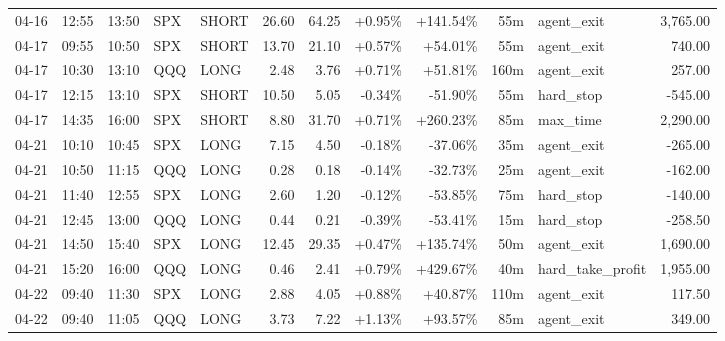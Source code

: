 \documentclass[11pt,a4paper,twoside]{article}
\begin{document}
\begin{center}
\begin{longtable}{>{\color{txtmain}}l l l l l r r r r r >{\color{txtmain}}l r}
04-16 & 12:55 & 13:50 & SPX & SHORT & 26.60 & 64.25 & \textcolor{wingreen}{+0.95\%} & \textcolor{wingreen}{+141.54\%} & 55m & agent\_exit & \textcolor{wingreen}{3,765.00} \\
04-17 & 09:55 & 10:50 & SPX & SHORT & 13.70 & 21.10 & \textcolor{wingreen}{+0.57\%} & \textcolor{wingreen}{+54.01\%} & 55m & agent\_exit & \textcolor{wingreen}{740.00} \\
04-17 & 10:30 & 13:10 & QQQ & LONG & 2.48 & 3.76 & \textcolor{wingreen}{+0.71\%} & \textcolor{wingreen}{+51.81\%} & 160m & agent\_exit & \textcolor{wingreen}{257.00} \\
04-17 & 12:15 & 13:10 & SPX & SHORT & 10.50 & 5.05 & \textcolor{lossred}{-0.34\%} & \textcolor{lossred}{-51.90\%} & 55m & hard\_stop & \textcolor{lossred}{-545.00} \\
04-17 & 14:35 & 16:00 & SPX & SHORT & 8.80 & 31.70 & \textcolor{wingreen}{+0.71\%} & \textcolor{wingreen}{+260.23\%} & 85m & max\_time & \textcolor{wingreen}{2,290.00} \\
04-21 & 10:10 & 10:45 & SPX & LONG & 7.15 & 4.50 & \textcolor{lossred}{-0.18\%} & \textcolor{lossred}{-37.06\%} & 35m & agent\_exit & \textcolor{lossred}{-265.00} \\
04-21 & 10:50 & 11:15 & QQQ & LONG & 0.28 & 0.18 & \textcolor{lossred}{-0.14\%} & \textcolor{lossred}{-32.73\%} & 25m & agent\_exit & \textcolor{lossred}{-162.00} \\
04-21 & 11:40 & 12:55 & SPX & LONG & 2.60 & 1.20 & \textcolor{lossred}{-0.12\%} & \textcolor{lossred}{-53.85\%} & 75m & hard\_stop & \textcolor{lossred}{-140.00} \\
04-21 & 12:45 & 13:00 & QQQ & LONG & 0.44 & 0.21 & \textcolor{lossred}{-0.39\%} & \textcolor{lossred}{-53.41\%} & 15m & hard\_stop & \textcolor{lossred}{-258.50} \\
04-21 & 14:50 & 15:40 & SPX & LONG & 12.45 & 29.35 & \textcolor{wingreen}{+0.47\%} & \textcolor{wingreen}{+135.74\%} & 50m & agent\_exit & \textcolor{wingreen}{1,690.00} \\
04-21 & 15:20 & 16:00 & QQQ & LONG & 0.46 & 2.41 & \textcolor{wingreen}{+0.79\%} & \textcolor{wingreen}{+429.67\%} & 40m & hard\_take\_profit & \textcolor{wingreen}{1,955.00} \\
04-22 & 09:40 & 11:30 & SPX & LONG & 2.88 & 4.05 & \textcolor{wingreen}{+0.88\%} & \textcolor{wingreen}{+40.87\%} & 110m & agent\_exit & \textcolor{wingreen}{117.50} \\
04-22 & 09:40 & 11:05 & QQQ & LONG & 3.73 & 7.22 & \textcolor{wingreen}{+1.13\%} & \textcolor{wingreen}{+93.57\%} & 85m & agent\_exit & \textcolor{wingreen}{349.00} \\

\end{longtable}
\end{center}
\end{document}
